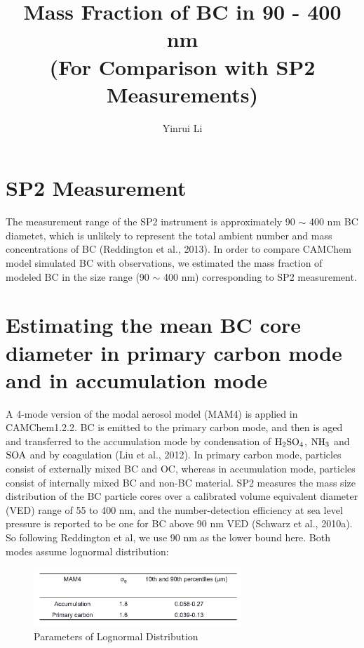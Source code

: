\documentclass[11pt]{article}
\title{\textbf{Mass Fraction of BC in 90 - 400 nm} \\ 
\textbf{(For Comparison with SP2 Measurements)}}
\author{Yinrui Li}
\date{}
\begin{document}
\maketitle



\section{SP2 Measurement} 

The measurement range of the SP2 instrument is approximately 90 $\sim$ 400 nm BC diametet, which is unlikely to represent the total ambient number and mass concentrations of BC (Reddington et al., 2013). In order to compare CAMChem model simulated BC with observations, we estimated the mass fraction of modeled BC in the size range (90 $\sim$ 400 nm) corresponding to SP2 measurement.


 
\section{Estimating the mean BC core diameter in primary carbon mode and in accumulation mode} 

A 4-mode version of the modal aerosol model (MAM4) is applied in CAMChem1.2.2. BC is emitted to the primary carbon mode, and then is aged and transferred to the accumulation mode by condensation of $\rm{H_2SO_4}$, $\rm{NH_3}$ and $\rm{SOA}$ and by coagulation (Liu et al., 2012). In primary carbon mode, particles consist of externally mixed BC and OC, whereas in accumulation mode, particles consist of internally mixed BC and non-BC material.
\bigskip
\noindent SP2 measures the mass size distribution of the BC particle cores over a calibrated volume equivalent diameter (VED) range of 55 to 400 nm, and the number-detection efficiency at sea level pressure is reported to be one for BC above 90 nm VED (Schwarz et al., 2010a). So following Reddington et al, we use 90 nm as the lower bound here. 
\bigskip
\noindent Both modes assume lognormal distribution:

\begin{figure}[!h] 
	\begin{center}
		\includegraphics[width = 0.7\textwidth]{Rplot01}
		\caption[]{\label{fig_P1} Parameters of Lognormal Distribution}
	\end{center}
\end{figure}
\end{document}
